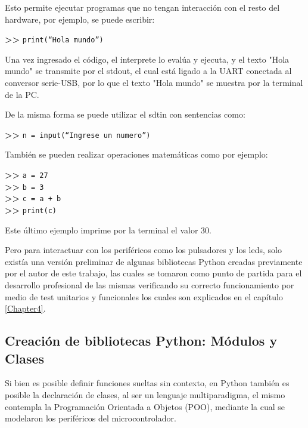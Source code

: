 Esto permite ejecutar programas que no tengan interacción con el resto del hardware, por ejemplo, se puede escribir:

\textbf{{\fontsize{16}{16}\selectfont \textgreater\textgreater}} \texttt{print(“Hola mundo”)}

Una vez ingresado el código, el interprete lo evalúa y ejecuta, y el texto "Hola mundo" se transmite por el stdout, el cual está ligado a la UART conectada al conversor serie-USB, por lo que el texto "Hola mundo" se muestra por la terminal de la PC.

De la misma forma se puede utilizar el sdtin con sentencias como:

\textbf{{\fontsize{16}{16}\selectfont \textgreater\textgreater}} \texttt{n = input(“Ingrese un numero”)}

También se pueden realizar operaciones matemáticas como por ejemplo:

\textbf{{\fontsize{16}{16}\selectfont \textgreater\textgreater}} \texttt{a = 27}\\
\textbf{{\fontsize{16}{16}\selectfont \textgreater\textgreater}} \texttt{b = 3}\\
\textbf{{\fontsize{16}{16}\selectfont \textgreater\textgreater}} \texttt{c = a + b}\\
\textbf{{\fontsize{16}{16}\selectfont \textgreater\textgreater}} \texttt{print(c)}

Este último ejemplo imprime por la terminal el valor 30.

Pero para interactuar con los periféricos como los pulsadores y los leds, solo existía una versión preliminar de algunas bibliotecas Python creadas previamente por el autor de este trabajo, las cuales se tomaron como punto de partida para el desarrollo profesional de las mismas verificando su correcto funcionamiento por medio de test unitarios y funcionales los cuales son explicados en el capítulo \ref{Chapter4}.


\subsection{Creación de bibliotecas Python: Módulos y Clases} 

Si bien es posible definir funciones sueltas sin contexto, en Python también es posible la declaración de clases, al ser un lenguaje multiparadigma, el mismo contempla la Programación Orientada a Objetos (POO), mediante la cual se modelaron los periféricos del microcontrolador.

